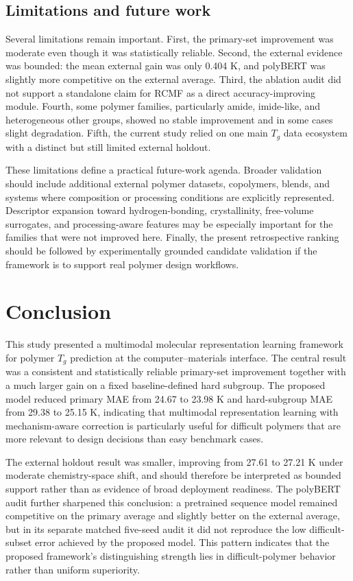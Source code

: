 \documentclass[review,12pt]{elsarticle}
\begin{document}
\subsection{Limitations and future work}

Several limitations remain important. First, the primary-set improvement was moderate even though it was statistically reliable. Second, the external evidence was bounded: the mean external gain was only 0.404 K, and polyBERT was slightly more competitive on the external average. Third, the ablation audit did not support a standalone claim for RCMF as a direct accuracy-improving module. Fourth, some polymer families, particularly amide, imide-like, and heterogeneous other groups, showed no stable improvement and in some cases slight degradation. Fifth, the current study relied on one main $T_g$ data ecosystem with a distinct but still limited external holdout.

These limitations define a practical future-work agenda. Broader validation should include additional external polymer datasets, copolymers, blends, and systems where composition or processing conditions are explicitly represented. Descriptor expansion toward hydrogen-bonding, crystallinity, free-volume surrogates, and processing-aware features may be especially important for the families that were not improved here. Finally, the present retrospective ranking should be followed by experimentally grounded candidate validation if the framework is to support real polymer design workflows.

\section{Conclusion}

This study presented a multimodal molecular representation learning framework for polymer $T_g$ prediction at the computer--materials interface. The central result was a consistent and statistically reliable primary-set improvement together with a much larger gain on a fixed baseline-defined hard subgroup. The proposed model reduced primary MAE from 24.67 to 23.98 K and hard-subgroup MAE from 29.38 to 25.15 K, indicating that multimodal representation learning with mechanism-aware correction is particularly useful for difficult polymers that are more relevant to design decisions than easy benchmark cases.

The external holdout result was smaller, improving from 27.61 to 27.21 K under moderate chemistry-space shift, and should therefore be interpreted as bounded support rather than as evidence of broad deployment readiness. The polyBERT audit further sharpened this conclusion: a pretrained sequence model remained competitive on the primary average and slightly better on the external average, but in its separate matched five-seed audit it did not reproduce the low difficult-subset error achieved by the proposed model. This pattern indicates that the proposed framework's distinguishing strength lies in difficult-polymer behavior rather than uniform superiority.
\end{document}
